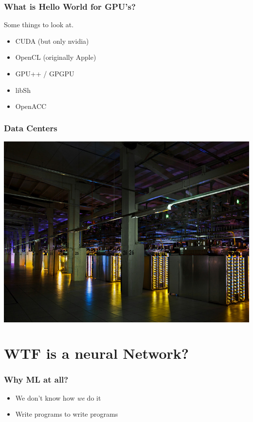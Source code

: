 \begin{frame}
  \frametitle{What is Hello World for GPU's?}
  Some things to look at.  
  \begin{itemize}
  \item CUDA (but only nvidia) \hspace{3mm}
  \item OpenCL (originally Apple) \hspace{3mm}
  \item GPU++ / GPGPU \hspace{3mm}
  \item libSh \hspace{3mm}
  \item OpenACC \hspace{3mm}
  \end{itemize}
\end{frame}

\begin{frame}
  \frametitle{Data Centers}
  \includegraphics[width=.9\textwidth]{google-dc.png}

\end{frame}

\section{WTF is a neural Network?}

\begin{frame}
  \frametitle{Why ML at all?}
  \begin{itemize}
  \item We don't know how \textit{we} do it
  \item Write programs to write programs
  \end{itemize}
\end{frame}

